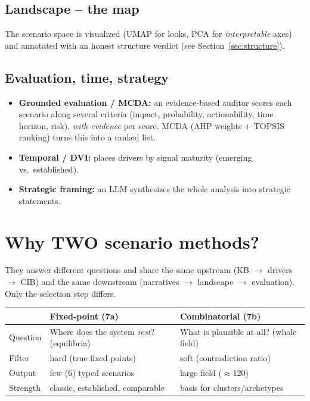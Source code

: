 \documentclass[11pt,a4paper]{article}
\begin{document}
\subsection{Landscape -- the map}
The scenario space is visualized (UMAP for looks, PCA for \emph{interpretable} axes) and annotated with an
honest structure verdict (see Section~\ref{sec:structure}).

\subsection{Evaluation, time, strategy}
\begin{itemize}
  \item \textbf{Grounded evaluation / MCDA:} an evidence-based auditor scores each scenario along several
  criteria (impact, probability, actionability, time horizon, risk), \emph{with evidence} per score. MCDA
  (AHP weights + TOPSIS ranking) turns this into a ranked list.
  \item \textbf{Temporal / DVI:} places drivers by signal maturity (emerging vs.\ established).
  \item \textbf{Strategic framing:} an LLM synthesizes the whole analysis into strategic statements.
\end{itemize}

\section{Why TWO scenario methods?}

They answer different questions and share the same upstream (KB $\to$ drivers $\to$ CIB) and the same
downstream (narratives $\to$ landscape $\to$ evaluation). Only the selection step differs.

\begin{center}\small
\begin{tabular}{@{}p{3.1cm}p{5.3cm}p{5.3cm}@{}}
\toprule
 & \textbf{Fixed-point (7a)} & \textbf{Combinatorial (7b)} \\
\midrule
Question & Where does the system \emph{rest}? (equilibria) & What is plausible at all? (whole field) \\
Filter & hard (true fixed points) & soft (contradiction ratio) \\
Output & few (6) typed scenarios & large field ($\approx$120) \\
Strength & classic, established, comparable & basis for clusters/archetypes \\
\bottomrule
\end{tabular}
\end{center}
\end{document}
